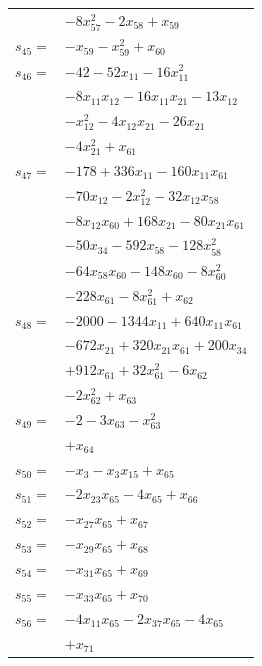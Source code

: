 \begin{longtable}{@{}r@{\;}l@{}}
 & \(\displaystyle -8x_{57}^{2} -2x_{58} +x_{59}\) \\[3pt]
\(s_{45}=\) & \(\displaystyle -x_{59} -x_{59}^{2} +x_{60}\) \\[3pt]
\(s_{46}=\) & \(\displaystyle -42 -52x_{11} -16x_{11}^{2}\) \\
 & \(\displaystyle -8x_{11}x_{12} -16x_{11}x_{21} -13x_{12}\) \\
 & \(\displaystyle -x_{12}^{2} -4x_{12}x_{21} -26x_{21}\) \\
 & \(\displaystyle -4x_{21}^{2} +x_{61}\) \\[3pt]
\(s_{47}=\) & \(\displaystyle -178 +336x_{11} -160x_{11}x_{61}\) \\
 & \(\displaystyle -70x_{12} -2x_{12}^{2} -32x_{12}x_{58}\) \\
 & \(\displaystyle -8x_{12}x_{60} +168x_{21} -80x_{21}x_{61}\) \\
 & \(\displaystyle -50x_{34} -592x_{58} -128x_{58}^{2}\) \\
 & \(\displaystyle -64x_{58}x_{60} -148x_{60} -8x_{60}^{2}\) \\
 & \(\displaystyle -228x_{61} -8x_{61}^{2} +x_{62}\) \\[3pt]
\(s_{48}=\) & \(\displaystyle -2000 -1344x_{11} +640x_{11}x_{61}\) \\
 & \(\displaystyle -672x_{21} +320x_{21}x_{61} +200x_{34}\) \\
 & \(\displaystyle +912x_{61} +32x_{61}^{2} -6x_{62}\) \\
 & \(\displaystyle -2x_{62}^{2} +x_{63}\) \\[3pt]
\(s_{49}=\) & \(\displaystyle -2 -3x_{63} -x_{63}^{2}\) \\
 & \(\displaystyle +x_{64}\) \\[3pt]
\(s_{50}=\) & \(\displaystyle -x_{3} -x_{3}x_{15} +x_{65}\) \\[3pt]
\(s_{51}=\) & \(\displaystyle -2x_{23}x_{65} -4x_{65} +x_{66}\) \\[3pt]
\(s_{52}=\) & \(\displaystyle -x_{27}x_{65} +x_{67}\) \\[3pt]
\(s_{53}=\) & \(\displaystyle -x_{29}x_{65} +x_{68}\) \\[3pt]
\(s_{54}=\) & \(\displaystyle -x_{31}x_{65} +x_{69}\) \\[3pt]
\(s_{55}=\) & \(\displaystyle -x_{33}x_{65} +x_{70}\) \\[3pt]
\(s_{56}=\) & \(\displaystyle -4x_{11}x_{65} -2x_{37}x_{65} -4x_{65}\) \\
 & \(\displaystyle +x_{71}\) \\[3pt]

\end{longtable}
